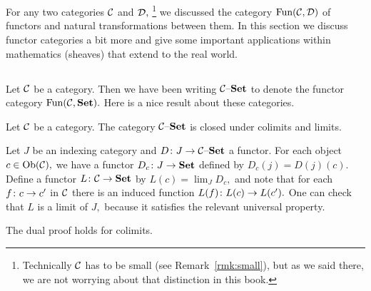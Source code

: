 \documentclass[CT4S-EN-RU]{subfiles}
\begin{document}
\section{}

\begin{blockENG}
For any two categories $\mathcal{C}$ and $\mathcal{D},$
\footnote{Technically $\mathcal{C}$ has to be small (see Remark~\ref{rmk:small}), but as we said there, we are not worrying about that distinction in this book.}
we discussed the category $\textnormal{Fun}(\mathcal{C},\mathcal{D})$ of functors and natural transformations between them. In this section we discuss functor categories a bit more and give some important applications within mathematics (sheaves) that extend to the real world.
\end{blockENG}

\begin{blockRUS}
\end{blockRUS}


\subsection{}

\begin{blockENG}
Let $\mathcal{C}$ be a category. Then we have been writing $\mathcal{C}{\text \textendash}{\mathbf{Set}}$ to denote the functor category $\textnormal{Fun}(\mathcal{C},{\mathbf{Set}}).$ Here is a nice result about these categories.
\end{blockENG}

\begin{blockRUS}
\end{blockRUS}

\begin{propositionENG}\label{prop:inst closed under colim lim}
Let $\mathcal{C}$ be a category. The category $\mathcal{C}{\text \textendash}{\mathbf{Set}}$ is closed under colimits and limits.
\end{propositionENG}

\begin{propositionRUS}\label{prop:inst closed under colim lim}
\end{propositionRUS}

\begin{proofENG}
Let $J$ be an indexing category and $D\colon J\rightarrow\mathcal{C}{\text \textendash}{\mathbf{Set}}$ a functor. For each object $c\in\textnormal{Ob}(\mathcal{C}),$ we have a functor $D_c\colon J\rightarrow{\mathbf{Set}}$ defined by $D_c(j)=D(j)(c).$ Define a functor $L\colon\mathcal{C}\rightarrow{\mathbf{Set}}$ by $L(c)=\lim_J D_c,$ and note that for each $f\colon c\rightarrow c'$ in $\mathcal{C}$ there is an induced function $L(f)\colon L(c)\rightarrow L(c').$ One can check that $L$ is a limit of $J,$ because it satisfies the relevant universal property. 

The dual proof holds for colimits.
\end{proofENG}
\end{document}
